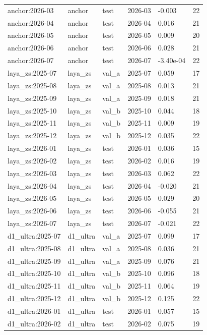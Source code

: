 \begin{tabular}{llllll}
anchor:2026-03 & anchor & test & 2026-03 & -0.003 & 22 \\
anchor:2026-04 & anchor & test & 2026-04 & 0.016 & 21 \\
anchor:2026-05 & anchor & test & 2026-05 & 0.009 & 20 \\
anchor:2026-06 & anchor & test & 2026-06 & 0.028 & 21 \\
anchor:2026-07 & anchor & test & 2026-07 & -3.40e-04 & 22 \\
laya\_zs:2025-07 & laya\_zs & val\_a & 2025-07 & 0.059 & 17 \\
laya\_zs:2025-08 & laya\_zs & val\_a & 2025-08 & 0.013 & 21 \\
laya\_zs:2025-09 & laya\_zs & val\_a & 2025-09 & 0.018 & 21 \\
laya\_zs:2025-10 & laya\_zs & val\_b & 2025-10 & 0.044 & 18 \\
laya\_zs:2025-11 & laya\_zs & val\_b & 2025-11 & 0.009 & 19 \\
laya\_zs:2025-12 & laya\_zs & val\_b & 2025-12 & 0.035 & 22 \\
laya\_zs:2026-01 & laya\_zs & test & 2026-01 & 0.036 & 15 \\
laya\_zs:2026-02 & laya\_zs & test & 2026-02 & 0.016 & 19 \\
laya\_zs:2026-03 & laya\_zs & test & 2026-03 & 0.062 & 22 \\
laya\_zs:2026-04 & laya\_zs & test & 2026-04 & -0.020 & 21 \\
laya\_zs:2026-05 & laya\_zs & test & 2026-05 & 0.029 & 20 \\
laya\_zs:2026-06 & laya\_zs & test & 2026-06 & -0.055 & 21 \\
laya\_zs:2026-07 & laya\_zs & test & 2026-07 & -0.021 & 22 \\
d1\_ultra:2025-07 & d1\_ultra & val\_a & 2025-07 & 0.099 & 17 \\
d1\_ultra:2025-08 & d1\_ultra & val\_a & 2025-08 & 0.036 & 21 \\
d1\_ultra:2025-09 & d1\_ultra & val\_a & 2025-09 & 0.076 & 21 \\
d1\_ultra:2025-10 & d1\_ultra & val\_b & 2025-10 & 0.096 & 18 \\
d1\_ultra:2025-11 & d1\_ultra & val\_b & 2025-11 & 0.064 & 19 \\
d1\_ultra:2025-12 & d1\_ultra & val\_b & 2025-12 & 0.125 & 22 \\
d1\_ultra:2026-01 & d1\_ultra & test & 2026-01 & 0.057 & 15 \\
d1\_ultra:2026-02 & d1\_ultra & test & 2026-02 & 0.075 & 19 \\

\end{tabular}
